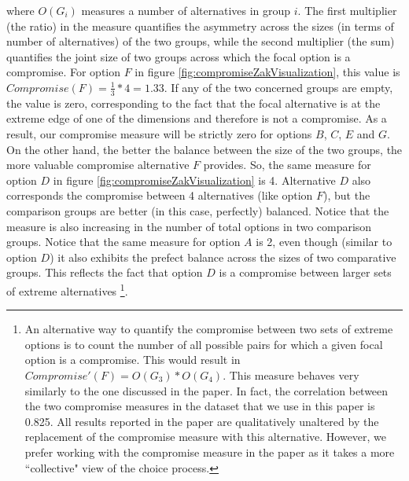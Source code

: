\documentclass[a4paper,12pt]{article}
\begin{document}
where $O(G_i)$ measures a number of alternatives in group $i$. The first multiplier (the ratio) in the measure quantifies the asymmetry across the sizes (in terms of number of alternatives) of the two groups, while the second multiplier (the sum) quantifies the joint size of two groups across which the focal option is a compromise. For option $F$ in figure \ref{fig:compromiseZakVisualization}, this value is $Compromise(F) = \frac{1}{3} * 4 = 1.33$. If any of the two concerned groups are empty, the value is zero, corresponding to the fact that the focal alternative is at the extreme edge of one of the dimensions and therefore is not a compromise. As a result, our compromise measure will be strictly zero for options $B$, $C$, $E$ and $G$. On the other hand, the better the balance between the size of the two groups, the more valuable compromise alternative $F$ provides. So, the same measure for option $D$ in figure \ref{fig:compromiseZakVisualization} is 4. Alternative $D$ also corresponds the compromise between 4 alternatives (like option $F$), but the comparison groups are better (in this case, perfectly) balanced. Notice that the measure is also increasing in the number of total options in two comparison groups. Notice that the same measure for option $A$ is 2, even though (similar to option $D$) it also exhibits the prefect balance across the sizes of two comparative groups. This reflects the fact that option $D$ is a compromise between larger sets of extreme alternatives \footnote{An alternative way to quantify the compromise between two sets of extreme options is to count the number of all possible pairs for which a given focal option is a compromise. This would result in $Compromise'(F) = O(G_3) * O(G_4)$. This measure behaves very similarly to the one discussed in the paper. In fact, the correlation between the two compromise measures in the dataset that we use in this paper is 0.825. All results reported in the paper are qualitatively unaltered by the replacement of the compromise measure with this alternative. However, we prefer working with the compromise measure in the paper as it takes a more ``collective" view of the choice process.}. 
\end{document}
